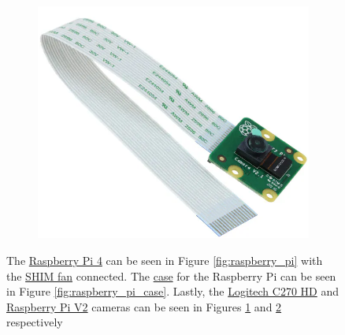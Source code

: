 \documentclass[../Head/report.tex]{subfiles}
\begin{document}
\begin{figure}[H]
\begin{subfigure}[b]{.17\textwidth}
         \vspace{-1.8em}
        \caption{}
        \label{fig:raspberry_pi_front_cam}
    \end{subfigure}
         \hspace{2.5em}
        \begin{subfigure}[b]{.16\textwidth}
        \centering
        \includegraphics[width=1\linewidth]{../Figures/raspberry_pi/raspberry_pi_cam.png}
         \vspace{-1.5em}
        \caption{}
        \label{fig:raspberry_pi_bottom_cam}
    \end{subfigure}
    \caption{The \href{https://raspberrypi.dk/produkt/raspberry-pi-4-model-b-8-gb/?gclid=CjwKCAjwmv-DBhAMEiwA7xYrd2LC9iHY0AN25mCwZ8Fs49enGRBWJXCx4h8_iUrUABRWneCpaoBL1xoCoqEQAvD_BwE}{Raspberry Pi 4} can be seen in Figure \ref{fig:raspberry_pi} with the \href{https://raspberrypi.dk/produkt/blaeser-shim-til-raspberry-pi/?gclid=CjwKCAjwmv-DBhAMEiwA7xYrd5JllLUeSBohDiBjfJkpH86XFp8hRJX4kEt2lRBBwthX2DqVFSvOvRoCUykQAvD_BwE}{SHIM fan} connected. The \href{https://www.dustinhome.dk/product/5011141918/okdo-raspberry-pi-4-standard-case-clear?ssel=false&gclid=CjwKCAjwmv-DBhAMEiwA7xYrd0phkQRZwAqPH6RzFVFdcMyjZXHYr7NCCICoSREcjA1byAvG8ZpApRoCPEoQAvD_BwE}{case} for the Raspberry Pi can be seen in Figure \ref{fig:raspberry_pi_case}. Lastly, the \href{https://www.elgiganten.dk/product/pc-tablets/webcam/162136/logitech-c270-hd-webkamera?gclid=CjwKCAjwmv-DBhAMEiwA7xYrdzGYXgj59-xIbjHVtHUrPCTyhi44RPsqtSSi8ABd0mK8TRYZaIw8CxoC8nIQAvD_BwE&gclsrc=aw.ds}{Logitech C270 HD} and \href{https://www.proshop.dk/Mini-PC-Android-Raspberry-Pi/Raspberry-Pi-Camera-V2/2621958?utm_source=google&utm_medium=cpc&utm_campaign=searchengine&gclid=CjwKCAjwmv-DBhAMEiwA7xYrd8j1kjOx7KOcc9q1OgHUSgPDvirQwUCqQY-arqanNgdlmTPhYd3GkRoC0L8QAvD_BwE}{Raspberry Pi V2} cameras can be seen in Figures \ref{fig:raspberry_pi_front_cam} and \ref{fig:raspberry_pi_bottom_cam} respectively}
    \label{fig:raspberry_pi_hardware}
\end{figure}
\end{document}
